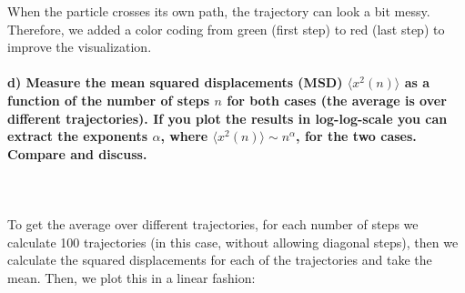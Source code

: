     When the particle crosses its own path, the trajectory can
    look a bit messy. Therefore, we added a color coding from 
    green (first step) to red (last step) to improve the 
    visualization.

\newpage
\paragraph{d) Measure the mean squared displacements (MSD) 
    $\langle x^2(n)\rangle$ as a function of the number of steps $n$ 
    for both cases (the average is over different trajectories). If you 
    plot the results in log-log-scale you can extract the exponents 
    $\alpha$, where $\langle x^2(n)\rangle\sim n^\alpha$, for the two 
    cases. Compare and discuss.
} \ \\
\\
    To get the average over different trajectories, for each number of 
    steps we calculate 100 trajectories (in this case, without 
    allowing diagonal steps), then we calculate the squared 
    displacements for each of the trajectories and take the mean.
    Then, we plot this in a linear fashion: \\

